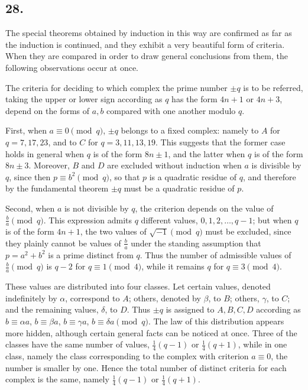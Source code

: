 \documentclass[12pt]{article}
\begin{document}
\subsection*{28.}

The special theorems obtained by induction in this way are confirmed as far as the induction is continued, and they exhibit a very beautiful form of criteria. When they are compared in order to draw general conclusions from them, the following observations occur at once.

The criteria for deciding to which complex the prime number $\pm q$ is to be referred, taking the upper or lower sign according as $q$ has the form $4n+1$ or $4n+3$, depend on the forms of $a,b$ compared with one another modulo $q$.

First, when $a\equiv0\pmod q$, $\pm q$ belongs to a fixed complex: namely to $A$ for $q=7,17,23$, and to $C$ for $q=3,11,13,19$. This suggests that the former case holds in general when $q$ is of the form $8n\pm1$, and the latter when $q$ is of the form $8n\pm3$. Moreover, $B$ and $D$ are excluded without induction when $a$ is divisible by $q$, since then $p\equiv b^2\pmod q$, so that $p$ is a quadratic residue of $q$, and therefore by the fundamental theorem $\pm q$ must be a quadratic residue of $p$.

Second, when $a$ is not divisible by $q$, the criterion depends on the value of $\frac{b}{a}\pmod q$. This expression admits $q$ different values, $0,1,2,\ldots,q-1$; but when $q$ is of the form $4n+1$, the two values of $\sqrt{-1}\pmod q$ must be excluded, since they plainly cannot be values of $\frac{b}{a}$ under the standing assumption that $p=a^2+b^2$ is a prime distinct from $q$. Thus the number of admissible values of $\frac{b}{a}\pmod q$ is $q-2$ for $q\equiv1\pmod4$, while it remains $q$ for $q\equiv3\pmod4$.

These values are distributed into four classes. Let certain values, denoted indefinitely by $\alpha$, correspond to $A$; others, denoted by $\beta$, to $B$; others, $\gamma$, to $C$; and the remaining values, $\delta$, to $D$. Thus $\pm q$ is assigned to $A,B,C,D$ according as $b\equiv\alpha a$, $b\equiv\beta a$, $b\equiv\gamma a$, $b\equiv\delta a\pmod q$. The law of this distribution appears more hidden, although certain general facts can be noticed at once. Three of the classes have the same number of values, $\frac14(q-1)$ or $\frac14(q+1)$, while in one class, namely the class corresponding to the complex with criterion $a\equiv0$, the number is smaller by one. Hence the total number of distinct criteria for each complex is the same, namely $\frac14(q-1)$ or $\frac14(q+1)$.
\end{document}
